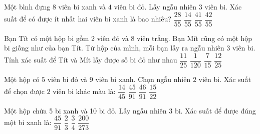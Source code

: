 \begin{ex}
Một bình đựng $8$ viên bi xanh và $4$ viên bi đỏ. Lấy ngẫu nhiên $3$ viên bi. Xác suất để có được ít nhất hai viên bi xanh là bao nhiêu?
\choice
{$\dfrac{28}{55}$}
{$\dfrac{14}{55}$}
{$\dfrac{41}{55}$}
{\True $\dfrac{42}{55}$}
\end{ex}
\begin{ex}
Bạn Tít có một hộp bi gồm $2$ viên đỏ và $8$ viên trắng. Bạn Mít cũng có một hộp bi giống như của bạn Tít. Từ hộp của mình, mỗi bạn lấy ra ngẫu nhiên $3$ viên bi. Tính xác suất để Tít và Mít lấy được số bi đỏ như nhau
\choice
{\True $\dfrac{11}{25}$}
{$\dfrac{1}{120}$}
{$\dfrac{7}{15}$}
{$\dfrac{12}{25}$}
\end{ex}
\begin{ex}
Một hộp có $5$ viên bi đỏ và $9$ viên bi xanh. Chọn ngẫu nhiên $2$ viên bi. Xác suất để chọn được $2$ viên bi khác màu là:
\choice
{$\dfrac{14}{45}$}
{\True $\dfrac{45}{91}$}
{$\dfrac{46}{91}$}
{$\dfrac{15}{22}$}
\end{ex}
\begin{ex}
Một hộp chứa 5 bi xanh và 10 bi đỏ. Lấy ngẫu nhiên 3 bi. Xác suất để được đúng một bi xanh là:
\choice
{\True $\dfrac{45}{91}$}
{$\dfrac{2}{3}$}
{$\dfrac{3}{4}$}
{$\dfrac{200}{273}$}
\end{ex}
